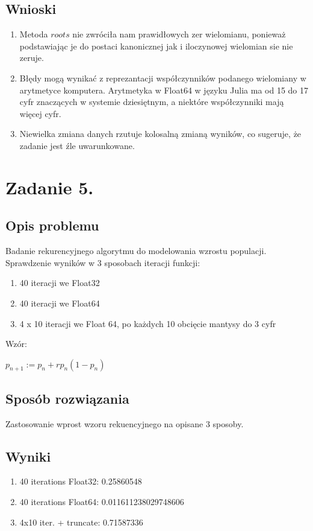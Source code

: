 \documentclass[12pt]{article}
\begin{document}
\subsection{Wnioski}
\begin{enumerate}
  \item Metoda $roots$ nie zwróciła nam prawidłowych zer wielomianu, ponieważ podstawiając je do postaci kanonicznej
  jak i iloczynowej wielomian sie nie zeruje.
  \item Błędy mogą wynikać z reprezantacji współczynników podanego wielomiany w arytmetyce
  komputera. Arytmetyka w Float64 w języku Julia ma od 15 do 17 cyfr znaczących w
  systemie dziesiętnym, a niektóre współczynniki mają więcej cyfr.
  \item Niewielka zmiana danych rzutuje kolosalną zmianą wyników, co sugeruje, że zadanie 
  jest źle uwarunkowane. 
\end{enumerate}

\newpage

\section{Zadanie 5.}

\subsection{Opis problemu}
  Badanie rekurencyjnego algorytmu do modelowania wzrostu populacji.
  \\Sprawdzenie wyników w 3 sposobach iteracji funkcji:
  \begin{enumerate}
    \item 40 iteracji we Float32
    \item 40 iteracji we Float64
    \item 4 x 10 iteracji we Float 64, po każdych 10 obcięcie mantysy do 3 cyfr 
  \end{enumerate}
  Wzór:
  \begin{center}
    $p_{n+1} := p_{n} + r p_{n} (1 - p_{n})$
  \end{center}
\subsection{Sposób rozwiązania}
Zastosowanie wprost wzoru rekuencyjnego na opisane 3 sposoby.
\subsection{Wyniki}
  \begin{enumerate}
    \item 40 iterations Float32: 0.25860548
    \item 40 iterations Float64: 0.011611238029748606
    \item 4x10 iter. + truncate: 0.71587336
  \end{enumerate}
\end{document}
